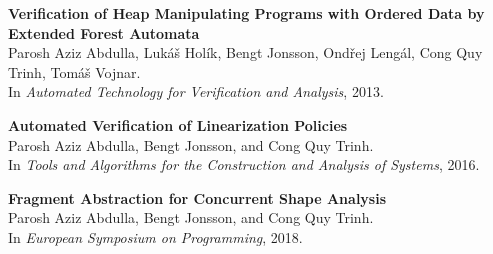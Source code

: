 % 

\newcommand{\conference}[1]{\marginpar{\tikz[baseline=(c.base)]\node(c);}}

\begin{listofpapers}
  \item \label{paper:ATVA'13}%
    {\bf Verification of Heap Manipulating Programs with
Ordered Data by Extended Forest Automata} 
    \\{\footnotesize Parosh Aziz Abdulla, Lukáš Holík, Bengt Jonsson, Ondřej Lengál, Cong Quy Trinh, Tomáš Vojnar}. 
   \\  In {\it Automated Technology for Verification and Analysis}, 2013.
    
  \item \label{paper:SAS16}%
    {\bf Automated Verification of Linearization Policies}
    \\{\footnotesize Parosh Aziz Abdulla, Bengt Jonsson, and Cong Quy Trinh}.
    \\In {\it Tools and Algorithms for the Construction and Analysis of Systems}, 2016.
    
    \item \label{paper:ESOP18}%
    {\bf Fragment Abstraction for Concurrent Shape Analysis}   
    \\{\footnotesize Parosh Aziz Abdulla, Bengt Jonsson, and Cong Quy Trinh}.
    \\In {\it European Symposium on Programming}, 2018.
\end{listofpapers}
